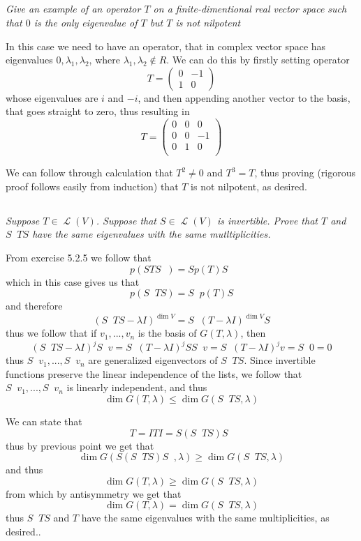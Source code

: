 \documentclass[11pt,oneside,titlepage]{book}
\DeclareMathOperator \map {\mathcal {L}}
\DeclareMathOperator \inv {^{-1}}
\begin{document}
\subsection{}

\textit{Give an example of an operator $T$ on a finite-dimentional real vector space
  such that $0$ is the only eigenvalue of $T$ but $T$ is not nilpotent}

In this case we need to have an operator, that in complex vector space has eigenvalues
$0, \lambda_1, \lambda_2$, where $\lambda_1, \lambda_2 \notin R$. We can do this
by firstly setting operator
$$T =
\begin{pmatrix}
  0& -1 \\
  1 & 0
\end{pmatrix}
$$
whose eigenvalues are $i$ and $-i$, and then appending another vector to the basis, that goes
straight to zero, thus resulting in
$$T =
\begin{pmatrix}
  0 & 0 & 0 \\
  0 & 0 & -1 \\
  0 & 1 & 0 \\
\end{pmatrix}
$$

We can follow through calculation that $T^2 \neq 0$ and $T^3 = T$, thus proving (rigorous
proof follows easily from induction) that $T$ is not nilpotent, as desired.

\subsection{}

\textit{Suppose $T \in \map(V)$. Suppose that $S \in \map(V)$ is invertible. Prove that $T$
  and $S\inv T S$ have the same eigenvalues with the same mutltiplicities.}

From exercise 5.2.5 we follow that
$$p(S T S \inv) = S p(T)  S \inv$$
which in this case gives us  that
$$p(S\inv T S) = S \inv p(T) S$$
and therefore
$$(S\inv T S - \lambda I)^{\dim V} = S\inv (T  - \lambda I)^{\dim V} S$$
thus we follow that if $v_1, ..., v_n$ is the basis of $G(T, \lambda)$, then
$$ (S\inv T S  - \lambda I)^j S \inv v=  S\inv ( T  - \lambda I)^j S S \inv v=
S\inv ( T  - \lambda I)^j  v=  S\inv 0 = 0$$
thus $S\inv v_1, ..., S\inv v_n$ are generalized eigenvectors of $S\inv T S$. Since invertible
functions preserve the linear independence of the lists, we follow that
$S\inv v_1, ..., S\inv v_n$ is linearly independent, and thus
$$\dim G(T, \lambda) \leq \dim G(S \inv T S, \lambda) $$

We can state that 
$$T = I T I = S (S \inv T S) S \inv$$
thus by previous point we get that 
$$\dim G(S (S \inv T S) S \inv, \lambda) \geq \dim G(S \inv T S, \lambda) $$
and thus
$$\dim G(T, \lambda) \geq \dim G(S \inv T S, \lambda) $$
from which by antisymmetry we get that
$$\dim G(T, \lambda) = \dim G(S \inv T S, \lambda) $$
thus $S \inv T S$ and $T$ have the same eigenvalues with the same multiplicities, as desired..
\end{document}
